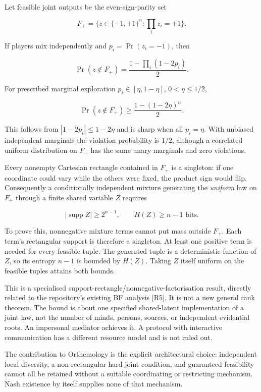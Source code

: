 \documentclass[11pt,a4paper]{article}
\begin{document}
Let feasible joint outputs be the even-sign-parity set

\nopagebreak[4]

\[
F_+=\{z\in\{-1,+1\}^n:\prod_i z_i=+1\}.
\]

If players mix independently and \(p_i=\Pr(z_i=-1)\), then

\nopagebreak[4]

\[
\Pr(z\notin F_+)=\frac{1-\prod_i(1-2p_i)}2.
\]

For prescribed marginal exploration \(p_i\in[\eta,1-\eta]\),
\(0<\eta\le1/2\),

\nopagebreak[4]

\[
\boxed{
\Pr(z\notin F_+)\ge\frac{1-(1-2\eta)^n}2.
}
\]

This follows from \(|1-2p_i|\le1-2\eta\) and is sharp when all
\(p_i=\eta\). With unbiased independent marginals the violation
probability is \(1/2\), although a correlated uniform distribution on
\(F_+\) has the same unary marginals and zero violations.

Every nonempty Cartesian rectangle contained in \(F_+\) is a singleton:
if one coordinate could vary while the others were fixed, the product
sign would flip. Consequently a conditionally independent mixture
generating the \emph{uniform} law on \(F_+\) through a finite shared
variable \(Z\) requires

\nopagebreak[4]

\[
\boxed{|\operatorname{supp}Z|\ge2^{n-1},\qquad H(Z)\ge n-1\text{ bits}.}
\]

To prove this, nonnegative mixture terms cannot put mass outside
\(F_+\). Each term's rectangular support is therefore a singleton. At
least one positive term is needed for every feasible tuple. The
generated tuple is a deterministic function of \(Z\), so its entropy
\(n-1\) is bounded by \(H(Z)\). Taking \(Z\) itself uniform on the
feasible tuples attains both bounds.

This is a specialised support-rectangle/nonnegative-factorisation
result, directly related to the repository's existing BF analysis
{[}R5{]}. It is not a new general rank theorem. The bound is about one
specified shared-latent implementation of a joint law, not the number of
minds, persons, sources, or independent evidential roots. An impersonal
mediator achieves it. A protocol with interactive communication has a
different resource model and is not ruled out.

The contribution to Orthemology is the explicit architectural choice:
independent local diversity, a non-rectangular hard joint condition, and
guaranteed feasibility cannot all be retained without a suitable
coordinating or restricting mechanism. Nash existence by itself supplies
none of that mechanism.
\end{document}
